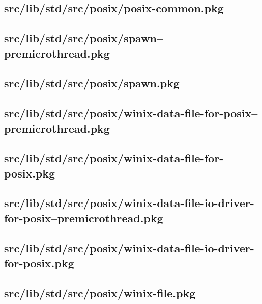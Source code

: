 \subsection{src/lib/std/src/posix/posix-common.pkg}


\subsection{src/lib/std/src/posix/spawn--premicrothread.pkg}


\subsection{src/lib/std/src/posix/spawn.pkg}


\subsection{src/lib/std/src/posix/winix-data-file-for-posix--premicrothread.pkg}


\subsection{src/lib/std/src/posix/winix-data-file-for-posix.pkg}


\subsection{src/lib/std/src/posix/winix-data-file-io-driver-for-posix--premicrothread.pkg}


\subsection{src/lib/std/src/posix/winix-data-file-io-driver-for-posix.pkg}


\subsection{src/lib/std/src/posix/winix-file.pkg}


